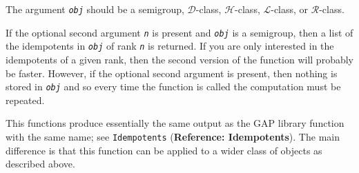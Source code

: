 \documentclass[a4paper,11pt]{report}
\begin{document}
{{{ The argument \mbox{\texttt{\mdseries\slshape obj}} should be a semigroup, $\mathcal{D}$-class, $\mathcal{H}$-class, $\mathcal{L}$-class, or $\mathcal{R}$-class.

 If the optional second argument \mbox{\texttt{\mdseries\slshape n}} is present and \mbox{\texttt{\mdseries\slshape obj}} is a semigroup, then a list of the idempotents in \mbox{\texttt{\mdseries\slshape obj}} of rank \mbox{\texttt{\mdseries\slshape n}} is returned. If you are only interested in the idempotents of a given rank,
then the second version of the function will probably be faster. However, if
the optional second argument is present, then nothing is stored in \mbox{\texttt{\mdseries\slshape obj}} and so every time the function is called the computation must be repeated.

 This functions produce essentially the same output as the \textsf{GAP} library function with the same name; see \texttt{Idempotents} (\textbf{Reference: Idempotents}). The main difference is that this function can be applied to a wider class of
objects as described above.

}}}
\end{document}
